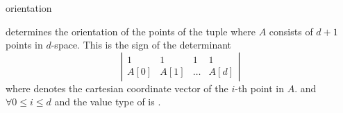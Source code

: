 \ccHtmlNoRefLinks
\begin{ccRefFunction}{orientation}
\ccHtmlNoLinks

{determines the orientation of the points of the tuple
 \ccc{A = tuple [first,last)} where $A$ consists of $d + 1$ points in 
 $d$-space. This is the sign of the determinant
  \[ \left| \begin{array}{cccc}
  1 & 1 & 1 & 1 \\
  A[0] & A[1] & \dots & A[d]
  \end{array}  \right|  \]
  where  denotes the cartesian coordinate vector of 
  the $i$-th point in $A$.
  \ccPrecond \ccc{size [first,last) == d+1} and 
   $\forall 0 \leq i \leq d$
  and the value type of  is .
}

\end{ccRefFunction}

